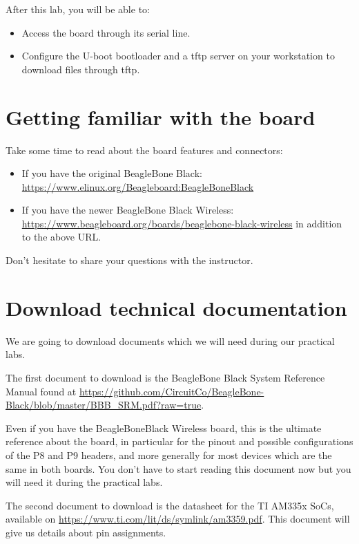 
After this lab, you will be able to:
\begin{itemize}
\item Access the board through its serial line.
\item Configure the U-boot bootloader and a tftp server
      on your workstation to download files through tftp.
\end{itemize}

\section{Getting familiar with the board}

Take some time to read about the board features and connectors:

\begin{itemize}
   \item If you have the original BeagleBone Black:\\
         \url{https://www.elinux.org/Beagleboard:BeagleBoneBlack}
   \item If you have the newer BeagleBone Black Wireless:\\
	 \url{https://www.beagleboard.org/boards/beaglebone-black-wireless}
         in addition to the above URL.
\end{itemize}

Don't hesitate to share your questions with the instructor.

\section{Download technical documentation}

We are going to download documents which we will need during our
practical labs.

The first document to download is the BeagleBone Black System Reference Manual found at
\url{https://github.com/CircuitCo/BeagleBone-Black/blob/master/BBB_SRM.pdf?raw=true}.

Even if you have the BeagleBoneBlack Wireless board, this is the
ultimate reference about the board, in particular for the pinout and
possible configurations of the P8 and P9 headers, and more generally
for most devices which are the same in both boards.
You don't have to start reading this document now but you will need it
during the practical labs.

The second document to download is the datasheet for the
TI AM335x SoCs, available on
\url{https://www.ti.com/lit/ds/symlink/am3359.pdf}. This document will
give us details about pin assignments.

